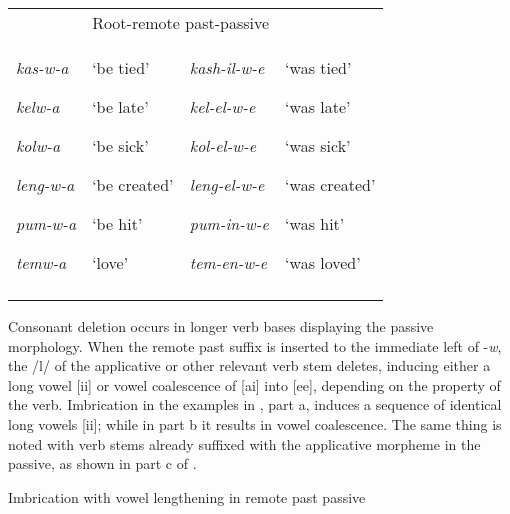 \documentclass[output=paper]{langsci/langscibook}
\begin{document}
\begin{tabular}{llll}
\lsptoprule
\multicolumn{2}{l}{\mdseries Root-passive-FV} & \multicolumn{2}{l}{\mdseries Root-remote past-passive}\\
{\mdseries \emph{kas-w-a}}

{\mdseries \emph{kelw-a}}

{\mdseries \emph{kolw-a}}

{\mdseries \emph{leng-w-a}}

{\mdseries \emph{pum-w-a}}

\mdseries \emph{temw-a  } & {\mdseries ‘be tied’}

{\mdseries ‘be late’}

{\mdseries ‘be sick’}

{\mdseries ‘be created’}

{\mdseries ‘be hit’}

\mdseries ‘love’ & {\mdseries \emph{kash-il-w-e}}

{\mdseries \emph{kel-el-w-e}}

{\mdseries \emph{kol-el-w-e}}

{\mdseries \emph{leng-el-w-e}}

{\mdseries \emph{pum-in-w-e}}

\mdseries \emph{tem-en-w-e} & {\mdseries ‘was tied’}

{\mdseries ‘was late’}

{\mdseries ‘was sick’}

{\mdseries ‘was created’}

{\mdseries ‘was hit’}

\mdseries ‘was loved’\\
\lspbottomrule
\end{tabular}
Consonant deletion occurs in longer verb bases displaying the passive morphology. When the remote past suffix is inserted to the immediate left of -\textit{w}, the /l/ of the applicative or other relevant verb stem deletes, inducing either a long vowel [ii] or vowel coalescence of [ai] into [ee], depending on the property of the verb. Imbrication in the examples in , part a, induces a sequence of identical long vowels [ii]; while in part b it results in vowel coalescence. The same thing is noted with verb stems already suffixed with the applicative morpheme in the passive, as shown in part c of .

\begin{table}
\caption{Imbrication with vowel lengthening in remote past passive}
\label{tab:26}
\end{table}
\end{document}
